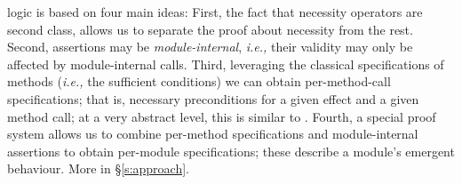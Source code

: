  
\Nec logic is based on four main ideas: 
First,  the fact that necessity operators are second class, allows us to 
 separate the proof about necessity from the rest.
 Second, assertions may be \emph{module-internal}, \textit{i.e.,}
their validity may only be affected by module-internal calls. 
Third, leveraging the classical  specifications of methods 
(\textit{i.e.,} the sufficient conditions) we can obtain per-method-call
 \Nec specifications; that is, necessary preconditions
  for a given effect and a given method call;  at a very abstract level, this is
similar to  \cite{threoremsFreeSep}.
Fourth,  a special proof system allows us to combine 
per-method
 \Nec specifications and module-internal assertions 
 to obtain per-module   \Nec specifications; these describe a module's
 emergent behaviour.
More in \S\ref{s:approach}.
 
